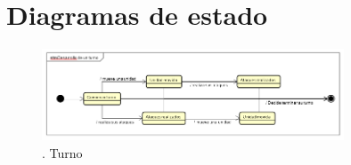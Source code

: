 \documentclass[titlepage,a4paper]{article}
\begin{document}
\section{Diagramas de estado}\label{sec:diagramasdesecuencia}


\begin{figure}[H]
\centering
\includegraphics[width=0.8\textwidth]{Turno.png}
\caption{\label{fig:seq01}. Turno}
\end{figure}
\end{document}
